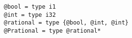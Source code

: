 \documentclass[10pt,a4paper]{article}
\begin{document}
\begin{verbatim}
@bool = type i1
@int = type i32
@rational = type {@bool, @int, @int}
@Prational = type @rational*
\end{verbatim}
\end{document}
